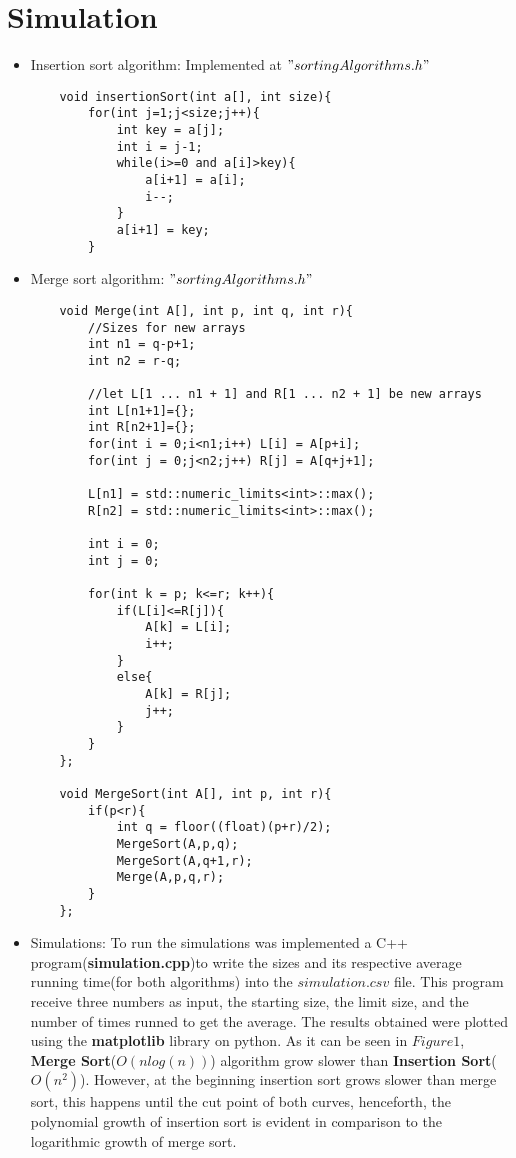 \documentclass[12pt]{article}
\begin{document}
\section{Simulation}

\begin{itemize}
    \item Insertion sort algorithm: Implemented at $"sortingAlgorithms.h"$
    
    \begin{lstlisting}
    void insertionSort(int a[], int size){
        for(int j=1;j<size;j++){
            int key = a[j];
            int i = j-1;
            while(i>=0 and a[i]>key){
                a[i+1] = a[i];
                i--;
            }
            a[i+1] = key;
        }
    \end{lstlisting}

    \item Merge sort algorithm: $"sortingAlgorithms.h"$
    
    \begin{lstlisting}
    void Merge(int A[], int p, int q, int r){
        //Sizes for new arrays
        int n1 = q-p+1;
        int n2 = r-q;
    
        //let L[1 ... n1 + 1] and R[1 ... n2 + 1] be new arrays
        int L[n1+1]={};
        int R[n2+1]={};
        for(int i = 0;i<n1;i++) L[i] = A[p+i];
        for(int j = 0;j<n2;j++) R[j] = A[q+j+1];
    
        L[n1] = std::numeric_limits<int>::max();
        R[n2] = std::numeric_limits<int>::max();
    
        int i = 0;
        int j = 0;
    
        for(int k = p; k<=r; k++){
            if(L[i]<=R[j]){
                A[k] = L[i];
                i++;
            }
            else{
                A[k] = R[j];
                j++;
            }
        }
    };

    void MergeSort(int A[], int p, int r){
        if(p<r){
            int q = floor((float)(p+r)/2);
            MergeSort(A,p,q);
            MergeSort(A,q+1,r);
            Merge(A,p,q,r);
        }
    };
    \end{lstlisting}
    
    \item Simulations: To run the simulations was implemented a C++ program(\textbf{simulation.cpp})to write the sizes and its respective average running time(for both algorithms) into the $simulation.csv$ file. This program receive three numbers as input, the starting size, the limit size, and the number of times runned to get the average. The results obtained were plotted using the \textbf{matplotlib} library on python. As it can be seen in $Figure 1$, \textbf{Merge Sort}($O(nlog(n))$) algorithm grow slower than \textbf{Insertion Sort}($O(n^2)$). However, at the beginning insertion sort grows slower than merge sort, this happens until the cut point of both curves, henceforth, the polynomial growth of insertion sort is evident in comparison to the logarithmic growth of merge sort.
    

\end{itemize}
\end{document}
